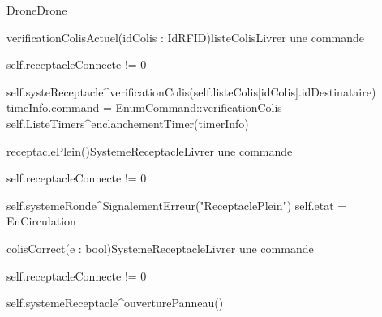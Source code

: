 \begin{OM}{Drone}{Drone}
    \begin{OMOperation}{verificationColisActuel(idColis : IdRFID)}{listeColis}{Livrer une commande}
        \begin{OMMessages}
        \end{OMMessages}
        \begin{OMPre}
            self.receptacleConnecte != 0
        \end{OMPre}
        \begin{OMPost}
            self.systeReceptacle^verificationColis(self.listeColis[idColis].idDestinataire)
            timeInfo.command = EnumCommand::verificationColis
            self.ListeTimers^enclanchementTimer(timerInfo)
        \end{OMPost}
    \end{OMOperation}

    \begin{OMOperation}{receptaclePlein()}{SystemeReceptacle}{Livrer une commande}
        \begin{OMMessages}
        \end{OMMessages}
        \begin{OMPre}
            self.receptacleConnecte != 0
        \end{OMPre}
        \begin{OMPost}
            self.systemeRonde^SignalementErreur("ReceptaclePlein")
            self.etat = EnCirculation
        \end{OMPost}
    \end{OMOperation}

    \begin{OMOperation}{colisCorrect(e : bool)}{SystemeReceptacle}{Livrer une commande}
        \begin{OMMessages}
        \end{OMMessages}
        \begin{OMPre}
            self.receptacleConnecte != 0
        \end{OMPre}
        \begin{OMPost}
            self.systemeReceptacle^ouverturePanneau()
        \end{OMPost}
    \end{OMOperation}


\end{OM}
